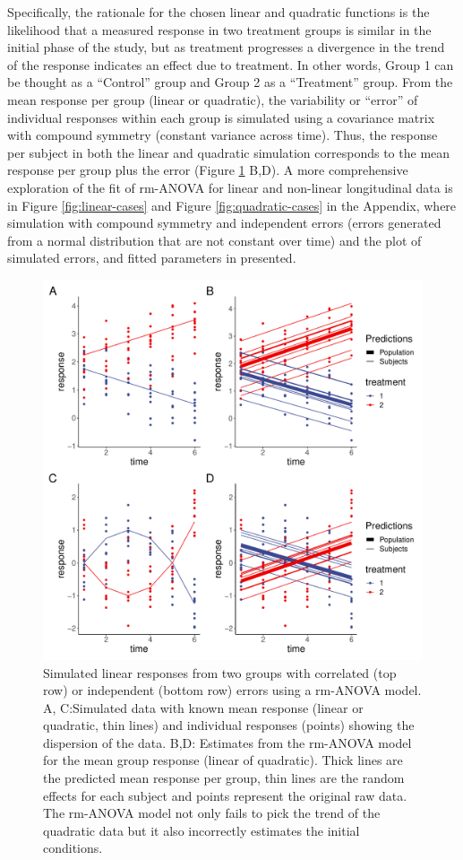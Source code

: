 \documentclass[
]{article}
\begin{document}
Specifically, the rationale for the chosen linear and quadratic functions is the likelihood that a measured response in two treatment groups is similar in the initial phase of the study, but as treatment progresses a divergence in the trend of the response indicates an effect due to treatment. In other words, Group 1 can be thought as a ``Control'' group and Group 2 as a ``Treatment'' group. From the mean response per group (linear or quadratic), the variability or ``error'' of individual responses within each group is simulated using a covariance matrix with compound symmetry (constant variance across time). Thus, the response per subject in both the linear and quadratic simulation corresponds to the mean response per group plus the error (Figure \ref{fig:l-q-response} B,D). A more comprehensive exploration of the fit of rm-ANOVA for linear and non-linear longitudinal data is in Figure \ref{fig:linear-cases} and Figure \ref{fig:quadratic-cases} in the Appendix, where simulation with compound symmetry and independent errors (errors generated from a normal distribution that are not constant over time) and the plot of simulated errors, and fitted parameters in presented.

\begin{figure}[!h]

{\centering \includegraphics[width=0.75\linewidth,]{Manuscript_AM_v5_files/figure-latex/l-q-response-1} 

}

\caption{Simulated linear responses from two groups with correlated (top row) or independent (bottom row) errors using a rm-ANOVA model. A, C:Simulated data with known mean response (linear or quadratic, thin lines) and individual responses (points) showing the dispersion of the data. B,D: Estimates from the rm-ANOVA model for the mean group response (linear of quadratic). Thick lines are the predicted mean response per group, thin lines are the random effects for each subject and points represent the original raw data. The rm-ANOVA model not only fails to pick the trend of the quadratic data but it also incorrectly estimates the initial conditions.}\label{fig:l-q-response}
\end{figure}
\end{document}
